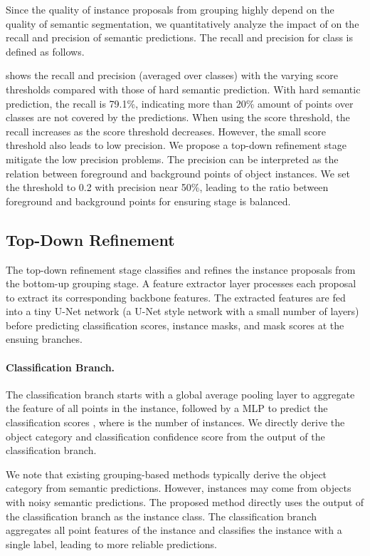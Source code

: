 \documentclass[10pt,twocolumn,letterpaper]{article}
\begin{document}
	Since the quality of instance proposals from grouping highly depend on the quality of semantic segmentation, we quantitatively analyze the impact of  on the recall and precision of semantic predictions. The recall and precision for class  is defined as follows.
	
	
	 shows the recall and precision (averaged over classes) with the varying score thresholds  compared with those of hard semantic prediction. With hard semantic prediction, the recall is 79.1\%, indicating more than 20\% amount of points over classes are not covered by the predictions. When using the score threshold, the recall increases as the score threshold decreases. However, the small score threshold also leads to low precision. We propose a top-down refinement stage mitigate the low precision problems. The precision can be interpreted as the relation between foreground and background points of object instances. We set the threshold to 0.2 with precision near 50\%, leading to the ratio between foreground and background points for ensuring stage is balanced.
	
	
	
	
	
\subsection{Top-Down Refinement}
	\label{ssec:top_down_refinement}
	The top-down refinement stage classifies and refines the instance proposals from the bottom-up grouping stage. A feature extractor layer processes each proposal to extract its corresponding backbone features. The extracted features are fed into a tiny U-Net network (a U-Net style network with a small number of layers) before predicting classification scores, instance masks, and mask scores at the ensuing branches.
	
	\paragraph{Classification Branch.} The classification branch starts with a global average pooling layer to aggregate the feature of all points in the instance, followed by a MLP to predict the classification scores , where  is the number of instances. We directly derive the object category and classification confidence score from the output of the classification branch. 
	
	We note that existing grouping-based methods typically derive the object category from semantic predictions. However, instances may come from objects with noisy semantic predictions. The proposed method directly uses the output of the classification branch as the instance class. The classification branch aggregates all point features of the instance and classifies the instance with a single label, leading to more reliable predictions. 
	
\end{document}
